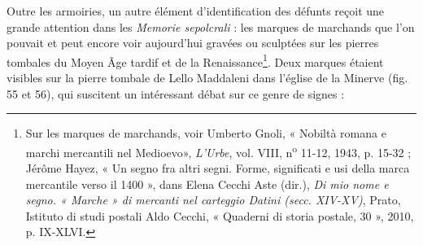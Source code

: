 \documentclass[12pt,twoside,openany]{book}
\begin{document}
Outre les armoiries, un autre élément d’identification des défunts reçoit une grande attention dans les \textit{Memorie sepolcrali} : les marques de marchands que l’on pouvait et peut encore voir aujourd’hui gravées ou sculptées sur les pierres tombales du Moyen Âge tardif et de la Renaissance\footnote{Sur les marques de marchands, voir Umberto Gnoli, « Nobiltà romana e marchi mercantili nel Medioevo», \textit{L’Urbe}, vol. VIII, n\textsuperscript{o} 11-12, 1943, p. 15-32 ; Jérôme Hayez, « Un segno fra altri segni. Forme, significati e usi della marca mercantile verso il 1400 », dans Elena Cecchi Aste (dir.), \textit{Di mio nome e segno. « Marche » di mercanti nel carteggio Datini (secc. XIV-XV)}, Prato, Istituto di studi postali Aldo Cecchi, « Quaderni di storia postale, 30 », 2010, p. IX-XLVI.}. Deux marques étaient visibles sur la pierre tombale de Lello Maddaleni dans l’église de la Minerve (fig. 55 et 56), qui suscitent un intéressant débat sur ce genre de signes :
\end{document}
